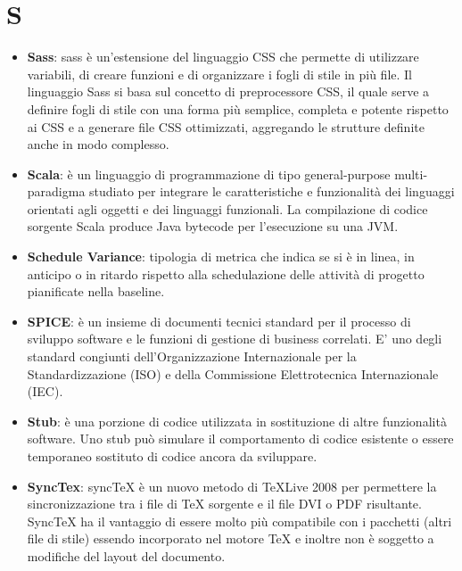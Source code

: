 \section{S}
\begin{itemize} 
	\item
	\textbf{Sass}: sass è un'estensione del linguaggio CSS che permette di utilizzare variabili, di creare funzioni e di organizzare i fogli di stile in più file. Il linguaggio Sass si basa sul concetto di preprocessore CSS, il quale serve a definire fogli di stile con una forma più semplice, completa e potente rispetto ai CSS e a generare file CSS ottimizzati, aggregando le strutture definite anche in modo complesso.
	\item
	\textbf{Scala}: è un linguaggio di programmazione di tipo general-purpose multi-paradigma studiato per integrare le caratteristiche e funzionalità dei linguaggi orientati agli oggetti e dei linguaggi funzionali. La compilazione di codice sorgente Scala produce Java bytecode per l'esecuzione su una JVM.
	\item
	\textbf{Schedule Variance}: tipologia di metrica che indica se si è in linea, in anticipo o in ritardo rispetto alla schedulazione delle attività di progetto pianificate nella baseline.
	\item 
	\textbf{SPICE}: è un insieme di documenti tecnici standard per il processo di sviluppo software e le funzioni di gestione di business correlati. E' uno degli standard congiunti dell'Organizzazione Internazionale per la Standardizzazione (ISO) e della Commissione Elettrotecnica Internazionale (IEC).
	\item
	\textbf{Stub}:  è una porzione di codice utilizzata in sostituzione di altre funzionalità software. Uno stub può simulare il comportamento di codice esistente o essere temporaneo sostituto di codice ancora da sviluppare. 
	\item
	\textbf{SyncTex}: syncTeX è un nuovo metodo di TeXLive 2008 per permettere la sincronizzazione tra i file di TeX sorgente e il file DVI o PDF risultante. SyncTeX ha il vantaggio di essere molto più compatibile con i pacchetti (altri file di stile) essendo incorporato nel motore TeX e inoltre non è soggetto a modifiche del layout del documento.
\end{itemize}